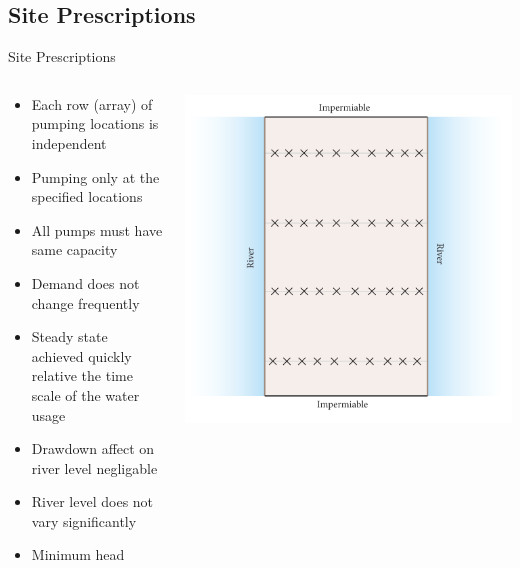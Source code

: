 \documentclass[xcolor=x11names,compress]{beamer}
\renewcommand{\(}{\begin{columns}}
\renewcommand{\)}{\end{columns}}
\newcommand{\<}[1]{\begin{column}{#1}}
\renewcommand{\>}{\end{column}}
\begin{document}
\subsection{Site Prescriptions}
\begin{frame}{Site Prescriptions}
\begin{columns}
\begin{column}{.7\textwidth}
\begin{itemize}
\item Each row (array) of pumping locations is independent
\pause
\item Pumping only at the specified locations
\pause
\item All pumps must have same capacity
\pause
\item Demand does not change frequently
\pause
\item Steady state achieved quickly relative the time scale of the water usage 
\pause
\item Drawdown affect on river level negligable
\pause
\item River level does not vary significantly
\pause
\item Minimum head
\end{itemize} 
\end{column}
\begin{column}{.3\textwidth}
\onslide\includegraphics[width=\textwidth]{site.pdf}
\end{column}
\end{columns}

\end{frame}
\end{document}
